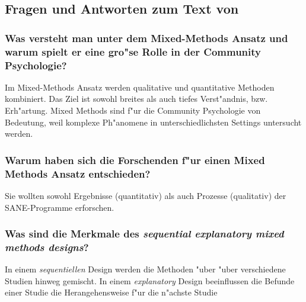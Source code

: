 \subsection{Fragen und Antworten zum Text von \textcite{campbell_integrating_2012}}
\subsubsection{Was  versteht man unter dem Mixed-Methods Ansatz und warum spielt er eine gro"se Rolle in der Community Psychologie?}
Im Mixed-Methods Ansatz werden qualitative und quantitative Methoden kombiniert. Das Ziel ist sowohl breites als auch tiefes Verst"andnis, bzw. Erh"artung. Mixed Methods sind f"ur die Community Psychologie von Bedeutung, weil komplexe Ph"anomene in unterschiedlichsten Settings untersucht werden.

\subsubsection{Warum haben sich die Forschenden f"ur einen Mixed Methods Ansatz entschieden?}
Sie wollten sowohl Ergebnisse (quantitativ) als auch Prozesse (qualitativ) der SANE-Programme erforschen.

\subsubsection{Was sind die Merkmale des \emph{sequential explanatory mixed methods designs}?}
In einem \emph{sequentiellen} Design werden die Methoden "uber "uber verschiedene Studien hinweg gemischt. In einem \emph{explanatory} Design beeinflussen die Befunde einer Studie die Herangehensweise f"ur die n"achste Studie 
